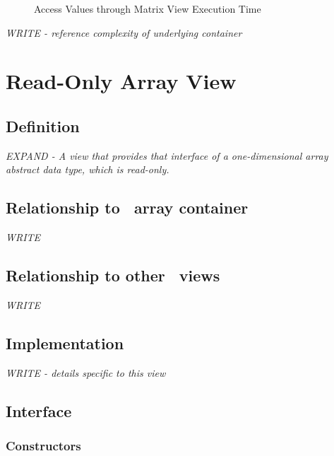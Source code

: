 \begin{figure}[p]
\caption{Access Values through Matrix View Execution Time}
\label{fig:mat-vw-access-exper}
\end{figure}

\emph{WRITE - reference complexity of underlying container}


\section{Read-Only Array View} \label{sec-aryro-vw}

\subsection{Definition}

\textit{EXPAND - A view that provides that interface of a one-dimensional array abstract data type, which is read-only.}
\vspace{0.4cm}

\subsection{Relationship to \stapl\ array container}

\textit{WRITE}

\subsection{Relationship to other \stapl\ views}

\textit{WRITE}

\subsection{Implementation}

\textit{WRITE - details specific to this view}

\subsection{Interface} \label{sec-aryro-vw-inter}

\subsubsection{Constructors}

